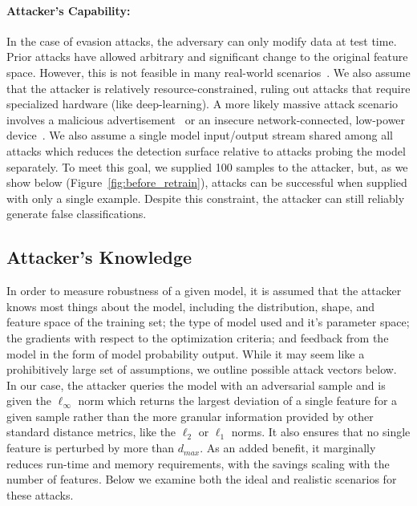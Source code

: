 \documentclass[runningheads]{llncs}
\begin{document}
\paragraph{Attacker's Capability: }


In the case of evasion attacks, the adversary can only modify data at test time. Prior attacks have allowed arbitrary and significant change to the original feature space. However, this is not feasible in many real-world scenarios~\cite{biggio2013evasion}. We also assume that the attacker is relatively resource-constrained, ruling out attacks that require specialized hardware (like deep-learning). A more likely massive attack scenario involves a malicious advertisement~\cite{liu_2020} or an insecure network-connected, low-power device~\cite{meidan_2018}. We also assume a single model input/output stream shared among all attacks which reduces the detection surface relative to attacks probing the model separately. To meet this goal, we supplied 100 samples to the attacker, but, as we show below (Figure~\ref{fig:before_retrain}), attacks can be successful when supplied with only a single example. Despite this constraint, the attacker can still reliably generate false classifications.

\subsection{Attacker's Knowledge}

In order to measure robustness of a given model, it is assumed that the attacker knows most things about the model, including the distribution, shape, and feature space of the training set; the type of model used and it's parameter space; the gradients with respect to the optimization criteria; and feedback from the model in the form of model probability output. While it may seem like a prohibitively large set of assumptions, we outline possible attack vectors below. In our case, the attacker queries the model with an adversarial sample and is given the $\ell_{\infty}$ norm which returns the largest deviation of a single feature for a given sample rather than the more granular information provided by other standard distance metrics, like the $\ell_2$ or $\ell_1$ norms. It also ensures that no single feature is perturbed by more than $d_{max}$. As an added benefit, it marginally reduces run-time and memory requirements, with the savings scaling with the number of features. Below we examine both the ideal and realistic scenarios for these attacks.
\end{document}
